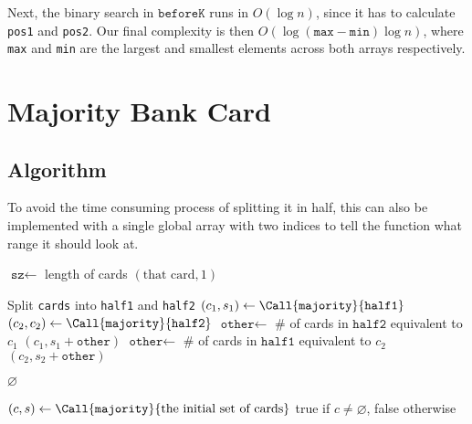 \documentclass[12pt]{article}
\begin{document}
Next, the binary search in $\texttt{beforeK}$ runs in $O(\log n)$,
since it has to calculate \texttt{pos1} and \texttt{pos2}.
Our final complexity is then $\boxed{O(\log (\texttt{max}-\texttt{min})\log n)}$,
where \texttt{max} and \texttt{min} are the largest and smallest elements
across both arrays respectively.

\pagebreak

\section{Majority Bank Card}

\subsection{Algorithm}

To avoid the time consuming process of splitting it in half,
this can also be implemented with a single global array with
two indices to tell the function what range it should look at.

\begin{algorithmic}[1]
        \State $\texttt{sz} \gets $ length of cards
            \State \Return $(\text{that card}, 1)$
        \EndIf

        \item[]
        \State Split \texttt{cards} into \texttt{half1} and \texttt{half2}
        \State $(c_1, s_1) \gets \Call{\texttt{majority}}{\texttt{half1}}$
        \State $(c_2, c_2) \gets \Call{\texttt{majority}}{\texttt{half2}}$
            \State $\texttt{other} \gets $ \# of cards in $\texttt{half2}$ equivalent to $c_1$
                \State \Return $(c_1, s_1+\texttt{other})$
            \EndIf
            \State $\texttt{other} \gets $ \# of cards in $\texttt{half1}$ equivalent to $c_2$
                \State \Return $(c_2, s_2+\texttt{other})$
            \EndIf
        \EndIf

        \item[]
        \State \Return $\varnothing$
    \EndProcedure

    \item[]
    \State $(c, s) \gets \Call{\texttt{majority}}{\text{the initial set of cards}}$
    \State \Return true if $c \ne \varnothing$, false otherwise
\end{algorithmic}
\end{document}
